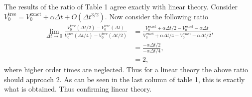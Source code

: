 \documentclass[10pt,english]{article}
\theoremstyle{plain}
\newcommand{\dt}{\Delta t}
\begin{document}
\begin{enumerate}
\begin{enumerate}
The results of the ratio of Table 1 agree exactly with linear theory. Consider $V_{0}^{\text{tree}}=V_{0}^{\text{exact}}+\alpha \dt + O(\dt^{3/2})$. Now consider the following ratio
\begin{align*}
\lim_{\dt\rightarrow 0} \frac{V_{0}^{\text{tree}}(\dt/2) -  V_{0}^{\text{tree}}(\dt)}{V_{0}^{\text{tree}}(\dt/4) -  V_{0}^{\text{tree}}(\dt/2)}&= \frac{V_{0}^{\text{exact}}+\alpha \dt/2 - V_{0}^{\text{exact}}-\alpha \dt}{V_{0}^{\text{exact}}+\alpha \dt/4-V_{0}^{\text{exact}}-\alpha \dt/2},\\
&= \frac{-\alpha \dt /2}{-\alpha \dt/4},\\
&= 2,
\end{align*}
where higher order times are neglected. Thus for a linear theory the above ratio should approach $2$. As can be seen in the last column of table 1, this is exactly what is obtained. Thus confirming linear theory.
\begin{table}[t]


\end{table}
\end{enumerate}
\end{enumerate}
\end{document}
